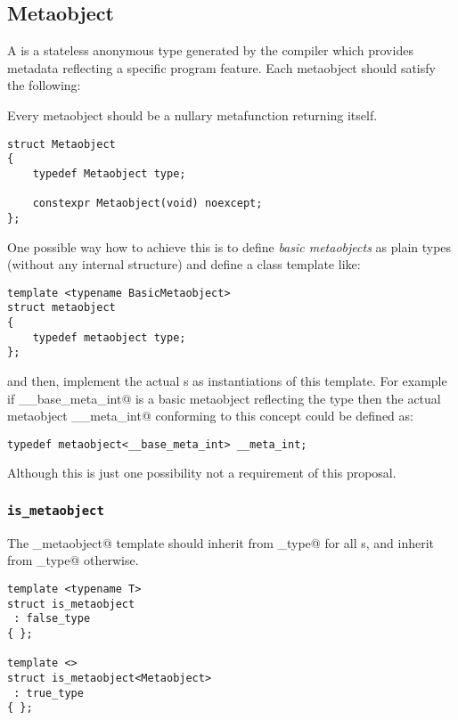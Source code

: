 \subsection{Metaobject}
\label{concept-Metaobject}

A  is a stateless anonymous type generated by the compiler which
provides metadata reflecting a specific program feature. Each metaobject
should satisfy the following:

Every metaobject should be a nullary metafunction returning itself.

\begin{verbatim}
struct Metaobject
{
	typedef Metaobject type;

	constexpr Metaobject(void) noexcept;
};
\end{verbatim}

One possible way how to achieve this is to define {\em basic metaobjects}
as plain types (without any internal structure) and define a class template like:

\begin{verbatim}
template <typename BasicMetaobject>
struct metaobject
{
	typedef metaobject type;
};
\end{verbatim}

and then, implement the actual s as instantiations of this template.
For example if \verb@__base_meta_int@ is a basic metaobject reflecting the \verb@int@
type then the actual metaobject \verb@__meta_int@ conforming to this concept could 
be defined as:

\begin{verbatim}
typedef metaobject<__base_meta_int> __meta_int;
\end{verbatim}

Although this is just one possibility not a requirement of this proposal.

\subsubsection{\texttt{is\_metaobject}}

The \verb@is_metaobject@ template should inherit from \verb@true_type@ for all s,
and inherit from \verb@false_type@ otherwise.

\begin{verbatim}
template <typename T>
struct is_metaobject
 : false_type
{ };

template <>
struct is_metaobject<Metaobject>
 : true_type
{ };
\end{verbatim}

